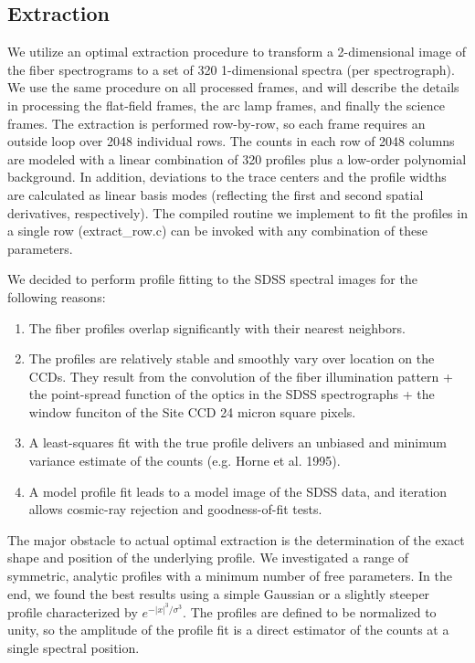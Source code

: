 

\subsection{Extraction}

We utilize an optimal extraction procedure to transform a 2-dimensional image of
the fiber spectrograms to a set of 320 1-dimensional spectra (per spectrograph).
We use the same procedure on all processed frames, 
and will describe the details in processing the flat-field frames, the
arc lamp frames, and finally the science frames.  
The extraction is performed row-by-row, so each frame requires an 
outside loop over 2048 individual rows.
The counts in each row of 2048 columns are modeled with a linear 
combination of 320 profiles plus a low-order
polynomial background.  In addition, deviations to the trace centers and
the profile widths are calculated as linear basis modes (reflecting the first
and second spatial derivatives, respectively).  The compiled routine
we implement to fit the profiles in a single row (extract_row.c) can
be invoked with any combination of these parameters.

We decided to perform profile fitting to the 
SDSS spectral images for the following reasons:  

\begin{enumerate}

\item{The fiber profiles overlap significantly with their nearest neighbors.}

\item{The profiles are relatively stable and smoothly vary over 
location on the CCDs.  They result from the convolution of the fiber 
illumination pattern + the point-spread function
of the optics in the SDSS spectrographs + the window funciton of the 
Site CCD 24 micron square pixels. }

\item{A least-squares fit with the true profile delivers an 
unbiased and minimum variance estimate of the counts (e.g. Horne et al. 1995).}

\item{A model profile fit leads to a model image of the SDSS data,
and iteration allows cosmic-ray rejection and goodness-of-fit tests.}

\end{enumerate}

The major obstacle to actual optimal extraction is the determination of 
the exact shape and position of the underlying profile.  
We investigated a range of symmetric, analytic profiles with a 
minimum number of free parameters.  In the end, we found the best 
results using a simple Gaussian or a slightly steeper profile 
characterized by $e^{-|x|^3/\sigma^3}$.  The profiles are defined to be 
normalized to unity, so the amplitude of the profile fit is a 
direct estimator of the counts at a single spectral position. 

